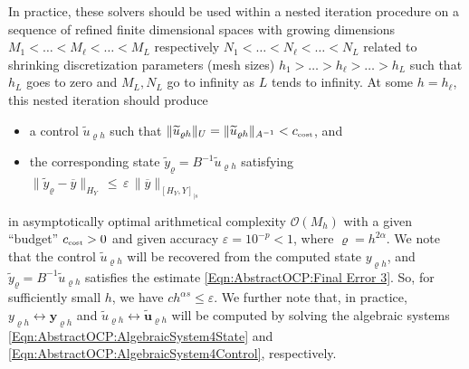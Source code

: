\documentclass{article}
\numberwithin{equation}{section}
\begin{document}
In practice, these solvers should be used within a nested iteration procedure
on a sequence of refined finite dimensional spaces with growing dimensions
$M_1 <  \dots < M_\ell <  \dots < M_L$ respectively
$N_1 <  \dots < N_\ell <  \dots < N_L$  related to 
shrinking discretization parameters (mesh sizes) 
$h_1 >  \dots > h_\ell >  \dots > h_L$ such that 
$h_L$ goes to zero and  $M_L, N_L$ go to infinity 
as $L$ tends to infinity.
At some $h=h_\ell$, this nested iteration should produce
\begin{itemize}
\item a control $\widetilde{u}_{\varrho h}$ such that 
  $\|\widetilde{u}_{\varrho h}\|_U =
  \|\widetilde{u}_{\varrho h}\|_{A^{-1}} < c_\text{\tiny cost}$, and
 \item  the corresponding state 
   $\widetilde{y}_{\varrho} = B^{-1} \widetilde{u}_{\varrho h}$ 
   satisfying 
   $ \| \widetilde{y}_\varrho - \overline{y} \|_{H_Y} \, \leq
   \, \varepsilon \, \| \overline{y} \|_{[H_Y,Y]_{|s}}$
\end{itemize}
in asymptotically optimal arithmetical complexity ${\mathcal{O}}(M_h)$ 
with a given ``budget'' $c_\text{\tiny cost} > 0$ and given accuracy
$\varepsilon = 10^{-p} < 1$, where $\varrho=h^{2\alpha}$. We note that
the control $\widetilde{u}_{\varrho h}$ will be recovered from the computed
state ${y}_{\varrho h}$, and
$\widetilde{y}_{\varrho} = B^{-1} \widetilde{u}_{\varrho h}$ 
satisfies the estimate \eqref{Eqn:AbstractOCP:Final Error 3}.
So, for sufficiently small $h$, we have $c h^{\alpha s} \le \varepsilon$.
We further note that, in practice,  
${y}_{\varrho h} \leftrightarrow \mathbf{y}_{\varrho h}$ and 
$\widetilde{u}_{\varrho h} \leftrightarrow \widetilde{\mathbf u}_{\varrho h}$
will be computed by solving the algebraic systems
\eqref{Eqn:AbstractOCP:AlgebraicSystem4State} and
\eqref{Eqn:AbstractOCP:AlgebraicSystem4Control}, respectively. 
\end{document}
